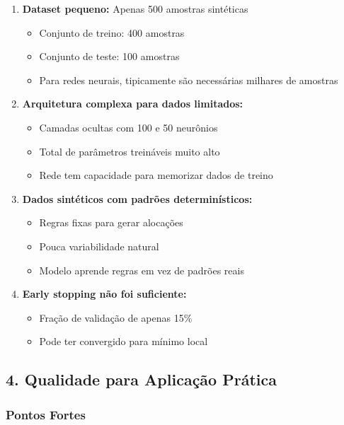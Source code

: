 \documentclass[12pt]{article}
\begin{document}
\begin{enumerate}
    \item \textbf{Dataset pequeno:} Apenas 500 amostras sintéticas
    \begin{itemize}
        \item Conjunto de treino: 400 amostras
        \item Conjunto de teste: 100 amostras
        \item Para redes neurais, tipicamente são necessárias milhares de amostras
    \end{itemize}

    \item \textbf{Arquitetura complexa para dados limitados:}
    \begin{itemize}
        \item Camadas ocultas com 100 e 50 neurônios
        \item Total de parâmetros treináveis muito alto
        \item Rede tem capacidade para memorizar dados de treino
    \end{itemize}

    \item \textbf{Dados sintéticos com padrões determinísticos:}
    \begin{itemize}
        \item Regras fixas para gerar alocações
        \item Pouca variabilidade natural
        \item Modelo aprende regras em vez de padrões reais
    \end{itemize}

    \item \textbf{Early stopping não foi suficiente:}
    \begin{itemize}
        \item Fração de validação de apenas 15\%
        \item Pode ter convergido para mínimo local
    \end{itemize}
\end{enumerate}

\newpage

\subsection*{4. Qualidade para Aplicação Prática}

\subsubsection*{Pontos Fortes}
\end{document}
